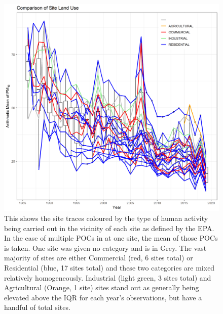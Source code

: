 \begin{figure}[ht]
\centering
\includegraphics[width = \textwidth]{Figures/SOCAB_metadata_Site_Land_use.png}
\caption{This shows the site traces coloured by the type of human activity being carried out in the vicinity of each site as defined by the EPA.  In the case of multiple \ac{POC}s in at one site, the mean of those \ac{POC}s is taken.  One site was given no category and is in Grey.  The vast majority of sites are either Commercial (red, 6 sites total) or Residential (blue, 17 sites total) and these two categories are mixed relatively homogeneously.  Industrial (light green, 3 sites total) and Agricultural (Orange, 1 site) sites stand out as generally being elevated above the IQR for each year's observations, but have a handful of total sites.}
\label{fig:SOCAB_metadata_Site_Land_use}
\end{figure}

